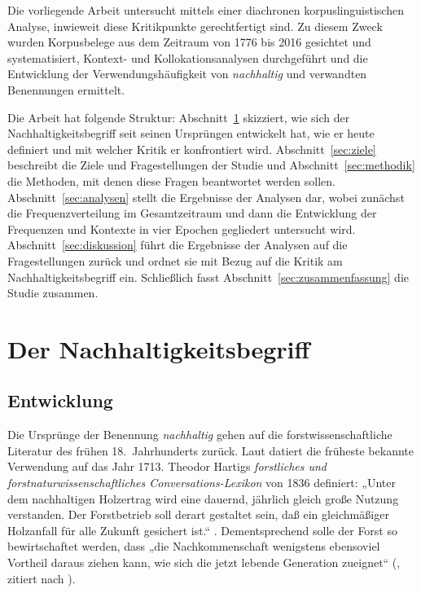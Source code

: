 \documentclass[
    german,
    a4paper,%
    12pt,%
    oneside,%
    toc=bibliography,
    final,
]{scrartcl}
\begin{document}
Die vorliegende Arbeit untersucht mittels einer diachronen korpuslinguistischen Analyse, inwieweit diese Kritikpunkte gerechtfertigt sind. Zu diesem Zweck wurden Korpusbelege aus dem Zeitraum von 1776 bis 2016 gesichtet und systematisiert, Kontext- und Kollokationsanalysen durchgeführt und die Entwicklung der Verwendungshäufigkeit von \textit{nachhaltig} und verwandten Benennungen ermittelt.

Die Arbeit hat folgende Struktur: Abschnitt~\ref{sec:entwicklung-definition} skizziert, wie sich der Nachhaltigkeitsbegriff seit seinen Ursprüngen entwickelt hat, wie er heute definiert und mit welcher Kritik er konfrontiert wird. Abschnitt~\ref{sec:ziele} beschreibt die Ziele und Fragestellungen der Studie und Abschnitt~\ref{sec:methodik} die Methoden, mit denen diese Fragen beantwortet werden sollen. Abschnitt~\ref{sec:analysen} stellt die Ergebnisse der Analysen dar, wobei zunächst die Frequenzverteilung im Gesamtzeitraum und dann die Entwicklung der Frequenzen und Kontexte in vier Epochen gegliedert untersucht wird. Abschnitt~\ref{sec:diskussion} führt die Ergebnisse der Analysen auf die Fragestellungen zurück und ordnet sie mit Bezug auf die Kritik am Nachhaltigkeitsbegriff ein. Schließlich fasst Abschnitt~\ref{sec:zusammenfassung} die Studie zusammen.

\section{Der Nachhaltigkeitsbegriff}
\label{sec:entwicklung-definition}

\subsection{Entwicklung}
\label{subsec:entwicklung}

Die Ursprünge der Benennung \textit{nachhaltig} gehen auf die forstwissenschaftliche Literatur des frühen 18.~Jahrhunderts zurück. Laut \citet[99]{Zürcher1965} datiert die früheste bekannte Verwendung auf das Jahr 1713. Theodor Hartigs \textit{forstliches und forstnaturwissenschaftliches Conversations-Lexikon} von 1836 definiert: „Unter dem nachhaltigen Holzertrag wird eine dauernd, jährlich gleich große Nutzung verstanden. Der Forstbetrieb soll derart gestaltet sein, daß ein gleichmäßiger Holzanfall für alle Zukunft gesichert ist.“ \citep[nach][100]{Zürcher1965}. Dementsprechend solle der Forst so bewirtschaftet werden, dass „die Nachkommenschaft wenigstens ebensoviel Vortheil daraus ziehen kann, wie sich die jetzt lebende Generation zueignet“ (\citealt[1]{Hartig1804}, zitiert nach \citealt[7]{OhlmeierBrunold2015}).
\end{document}
